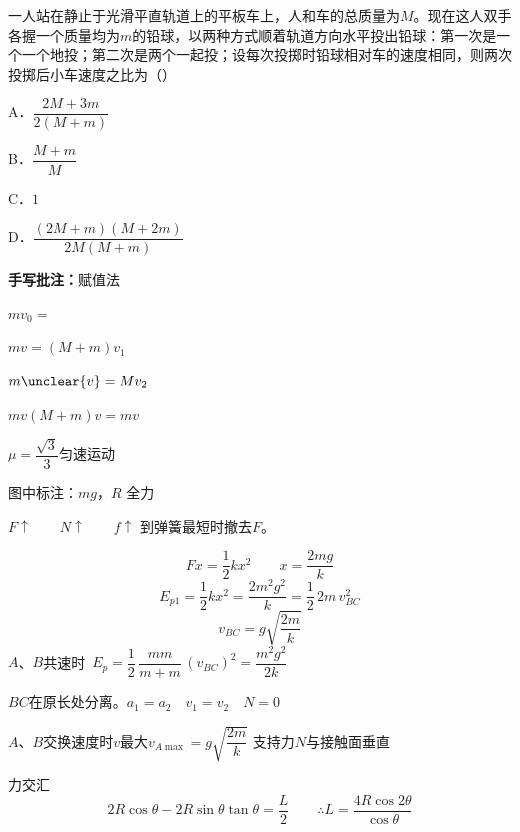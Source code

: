 \begin{problem}[5]
一人站在静止于光滑平直轨道上的平板车上，人和车的总质量为$M$。现在这人双手各握一个质量均为$m$的铅球，以两种方式顺着轨道方向水平投出铅球：第一次是一个一个地投；第二次是两个一起投；设每次投掷时铅球相对车的速度相同，则两次投掷后小车速度之比为（）

A．$\dfrac{2M+3m}{2(M+m)}$

B．$\dfrac{M+m}{M}$

C．$1$%

D．$\dfrac{(2M+m)(M+2m)}{2M(M+m)}$
\end{problem}

\textbf{手写批注：}赋值法

$mv_0=$%

$mv=(M+m)v_1$

$m\unclear{v}=Mv_2$

\quad $mv$\quad $(M+m)v=mv$%

$\mu=\dfrac{\sqrt{3}}{3}$\quad 匀速运动

图中标注：$mg$，$R$ 全力

$F\uparrow\qquad N\uparrow\qquad f\uparrow$
到弹簧最短时撤去$F$。

\[
Fx=\frac{1}{2}kx^2\qquad x=\frac{2mg}{k}
\]
\[
E_{p1}=\frac{1}{2}kx^2=\frac{2m^2g^2}{k}=\frac{1}{2}\,2m\,v_{BC}^2
\]
\[
v_{BC}=g\sqrt{\frac{2m}{k}}
\]
$A$、$B$共速时\ $E_p=\dfrac{1}{2}\,\dfrac{mm}{m+m}\,(v_{BC})^2=\dfrac{m^2g^2}{2k}$

$BC$在原长处分离。\quad $a_1=a_2\quad v_1=v_2\quad N=0$

$A$、$B$交换速度时$v$最大\quad $v_{A\max}=g\sqrt{\dfrac{2m}{k}}$
支持力$N$与接触面垂直

力交汇%
\[
2R\cos\theta-2R\sin\theta\tan\theta=\frac{L}{2}\qquad \therefore L=\frac{4R\cos2\theta}{\cos\theta}
\]
